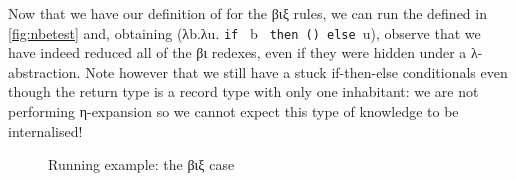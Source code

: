 Now that we have our definition of  for the βιξ rules, we
can run the  defined in \cref{fig:nbetest} and, obtaining
(λb.λu. \texttt{if~} b \texttt{~then~()~else~}u),
observe that
we have indeed reduced all of the βι redexes, even if they were
hidden under a λ-abstraction. Note however that we still have a stuck
if-then-else conditionals even though the return type is a record type
with only one inhabitant: we are not performing η-expansion so we cannot
expect this type of knowledge to be internalised!

\begin{figure}[h]
\caption{Running example: the βιξ case}\label{fig:betaiotaxitest}
\end{figure}
